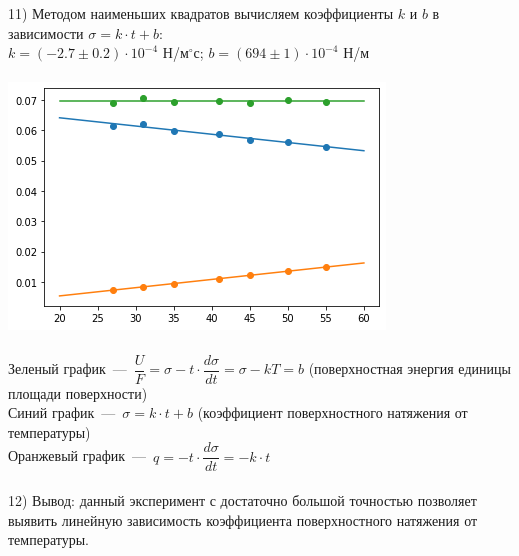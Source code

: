 \documentclass[12pt,a4paper]{article}
\begin{document}
    11) Методом наименьших квадратов вычисляем коэффициенты $k$ и $b$ в зависимости $\sigma = k \cdot t + b$: \\
    $k = (-2.7 \pm 0.2) \cdot 10^{-4}$ Н/м$^{\circ}$с; $b = (694 \pm 1) \cdot 10^{-4}$ Н/м \\\\
    \includegraphics[scale=0.8]{загруженное.png}\\\\
    Зеленый график~---~$\dfrac{U}{F} = \sigma - t \cdot \dfrac{d \sigma}{dt} = \sigma - kT = b$ (поверхностная энергия единицы площади поверхности)\\
    Синий график~---~$\sigma = k \cdot t + b$ (коэффициент поверхностного натяжения от температуры) \\ 
    Оранжевый график~---~$q = -t \cdot \dfrac{d \sigma}{dt} = -k \cdot t$ \\\\
    12) Вывод: данный эксперимент с достаточно большой точностью позволяет выявить линейную зависимость коэффициента поверхностного натяжения от температуры.
\end{document}
